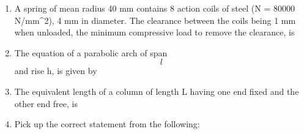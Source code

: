 \documentclass[11pt,a4paper]{article}
\begin{document}
\begin{enumerate}
\item{A spring of mean radius 40 mm contains 8 action coils of steel (N = 80000 N/mm\^{}2), 4 mm in diameter. The clearance between the coils being 1 mm when unloaded, the minimum compressive load to remove the clearance, is
}
\\
\item{The equation of a parabolic arch of span $$l$$ and rise h, is given by}
\\
\item{The equivalent length of a column of length L having one end fixed and the other end free, is}
\\
\item{Pick up the correct statement from the following:}
\begin{enumerate}[label=\Alph*.]

\end{enumerate}
\end{enumerate}
\end{document}
